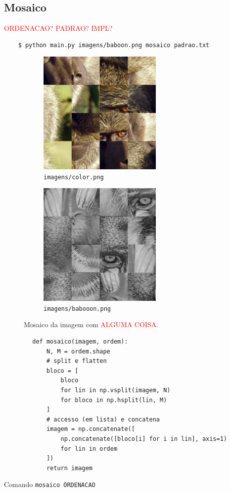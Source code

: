 \subsection{Mosaico} \label{sec:mosaico}

\textcolor{red}{ORDENACAO? PADRAO? IMPL?}

\begin{verbatim}
    $ python main.py imagens/baboon.png mosaico padrao.txt
\end{verbatim}

\begin{figure}[H]
    \centering
    \begin{subfigure}{0.45\textwidth}
        \centering
        \includegraphics[width=6cm]{resultados/colormsc.png}
        \caption{\texttt{imagens/color.png}}
    \end{subfigure}%
    \begin{subfigure}{0.45\textwidth}
        \centering
        \includegraphics[width=6cm]{resultados/baboonmsc.png}
        \caption{\texttt{imagens/babooon.png}}
        \label{fig:res:10}
    \end{subfigure}

    \caption{Mosaico da imagem com \textcolor{red}{ALGUMA COISA}.}
\end{figure}

\begin{listing}[H]
    \begin{verbatim}
        def mosaico(imagem, ordem):
            N, M = ordem.shape
            # split e flatten
            bloco = [
                bloco
                for lin in np.vsplit(imagem, N)
                for bloco in np.hsplit(lin, M)
            ]
            # accesso (em lista) e concatena
            imagem = np.concatenate([
                np.concatenate([bloco[i] for i in lin], axis=1)
                for lin in ordem
            ])
            return imagem
    \end{verbatim}

    \caption{Comando \texttt{mosaico ORDENACAO}}
\end{listing}

